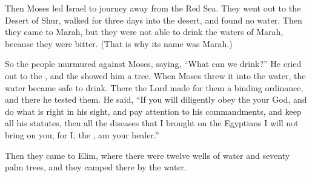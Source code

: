 {\par }{\PP {}Then Moses
led Israel
to journey
away from the Red
Sea.
They went out
to
the Desert
of Shur,
walked
for three
days
into the desert,
and found
no
water.
Then they came
to Marah,
but they were not
able
to drink
the waters
of Marah,
because
they were
bitter.
(That is why
its name
was Marah.)
\par }{\PP {}So the people
murmured
against
Moses,
saying,
“What
can we drink?”
He cried out
to
the {}, and the
{}
showed him
a tree.
When Moses threw
it into the water,
the water
became safe
to drink. There
the Lord
made
for them a binding
ordinance,
and there
he tested them.
He said,
“If
you will diligently
obey
the {}
your God,
and do
what is right
in his sight,
and pay attention
to his commandments,
and keep
all
his statutes,
then all
the diseases that
I
brought on the Egyptians
I
will not
bring
on
you, for
I,
the {},
am your healer.”
\par }{\PP {}Then they came
to Elim,
where there
were twelve
wells
of water
and seventy
palm
trees, and they camped
there
by
the water.


}
